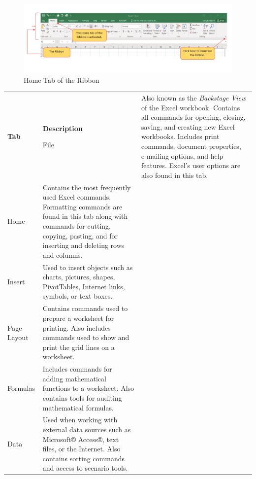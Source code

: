\begin{figure}[H]
	\centering
	\includegraphics[width=\maxwidth{.95\linewidth}]{gfx/ch01_fig06}
	\caption{Home Tab of the Ribbon}
	\label{01:fig06}
\end{figure}

\begin{table}[H]
	{\small
		\begin{longtable}{L{0.75in}L{3.50in}} %
			\textbf{Tab} & \textbf{Description} \endhead
			\hline

			File & Also known as the \textit{Backstage View} of the Excel workbook. Contains all commands for opening, closing, saving, and creating new Excel workbooks. Includes print commands, document properties, e-mailing options, and help features. Excel's user options are also found in this tab.\\

			Home & Contains the most frequently used Excel commands. Formatting commands are found in this tab along with commands for cutting, copying, pasting, and for inserting and deleting rows and columns.\\
			
			Insert & Used to insert objects such as charts, pictures, shapes, PivotTables, Internet links, symbols, or text boxes.\\
			
			Page Layout & Contains commands used to prepare a worksheet for printing. Also includes commands used to show and print the grid lines on a worksheet.\\
			
			Formulas & Includes commands for adding mathematical functions to a worksheet. Also contains tools for auditing mathematical formulas.\\
			
			Data & Used when working with external data sources such as Microsoft® Access®, text files, or the Internet. Also contains sorting commands and access to scenario tools.\\
			

\end{longtable}}
\end{table}
